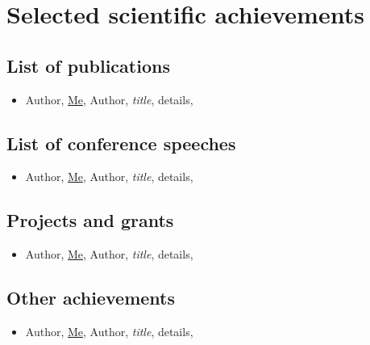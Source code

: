 \chapter{Selected scientific achievements}
\label{chapter:achievements}


\section{List of publications}

\begin{itemize}
    \item Author, \underline{Me}, Author, \textit{title}, details,
\end{itemize}


\section{List of conference speeches}

\begin{itemize}
    \item Author, \underline{Me}, Author, \textit{title}, details,
\end{itemize}


\section{Projects and grants}

\begin{itemize}
    \item Author, \underline{Me}, Author, \textit{title}, details,
\end{itemize}


\section{Other achievements}

\begin{itemize}
    \item Author, \underline{Me}, Author, \textit{title}, details,
\end{itemize}
